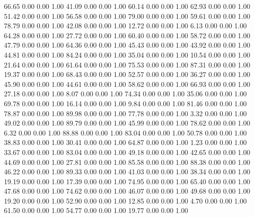    66.65   0.00   0.00   1.00
   41.09   0.00   0.00   1.00
   60.14   0.00   0.00   1.00
   62.93   0.00   0.00   1.00
   51.42   0.00   0.00   1.00
   56.58   0.00   0.00   1.00
   79.00   0.00   0.00   1.00
   59.61   0.00   0.00   1.00
   78.79   0.00   0.00   1.00
   42.08   0.00   0.00   1.00
   12.72   0.00   0.00   1.00
    6.13   0.00   0.00   1.00
   64.28   0.00   0.00   1.00
   27.72   0.00   0.00   1.00
   60.40   0.00   0.00   1.00
   58.72   0.00   0.00   1.00
   47.79   0.00   0.00   1.00
   64.36   0.00   0.00   1.00
   45.43   0.00   0.00   1.00
   43.92   0.00   0.00   1.00
   44.81   0.00   0.00   1.00
   84.24   0.00   0.00   1.00
   35.04   0.00   0.00   1.00
   10.54   0.00   0.00   1.00
   21.64   0.00   0.00   1.00
   61.64   0.00   0.00   1.00
   75.53   0.00   0.00   1.00
   87.31   0.00   0.00   1.00
   19.37   0.00   0.00   1.00
   68.43   0.00   0.00   1.00
   52.57   0.00   0.00   1.00
   36.27   0.00   0.00   1.00
   45.90   0.00   0.00   1.00
   44.61   0.00   0.00   1.00
   58.62   0.00   0.00   1.00
   66.93   0.00   0.00   1.00
   27.18   0.00   0.00   1.00
    8.07   0.00   0.00   1.00
   74.34   0.00   0.00   1.00
   35.06   0.00   0.00   1.00
   69.78   0.00   0.00   1.00
   16.14   0.00   0.00   1.00
    9.84   0.00   0.00   1.00
   81.46   0.00   0.00   1.00
   78.87   0.00   0.00   1.00
   89.98   0.00   0.00   1.00
   77.78   0.00   0.00   1.00
    3.32   0.00   0.00   1.00
   49.02   0.00   0.00   1.00
   89.79   0.00   0.00   1.00
   45.99   0.00   0.00   1.00
   78.62   0.00   0.00   1.00
    6.32   0.00   0.00   1.00
   88.88   0.00   0.00   1.00
   83.04   0.00   0.00   1.00
   50.78   0.00   0.00   1.00
   38.83   0.00   0.00   1.00
   30.41   0.00   0.00   1.00
   64.87   0.00   0.00   1.00
    1.23   0.00   0.00   1.00
   33.67   0.00   0.00   1.00
   83.04   0.00   0.00   1.00
   49.18   0.00   0.00   1.00
   42.65   0.00   0.00   1.00
   44.69   0.00   0.00   1.00
   27.81   0.00   0.00   1.00
   85.58   0.00   0.00   1.00
   88.38   0.00   0.00   1.00
   46.22   0.00   0.00   1.00
   89.33   0.00   0.00   1.00
   41.03   0.00   0.00   1.00
   38.34   0.00   0.00   1.00
   19.19   0.00   0.00   1.00
   17.39   0.00   0.00   1.00
   74.95   0.00   0.00   1.00
   65.40   0.00   0.00   1.00
   47.68   0.00   0.00   1.00
   74.62   0.00   0.00   1.00
   46.07   0.00   0.00   1.00
   49.68   0.00   0.00   1.00
   19.20   0.00   0.00   1.00
   52.90   0.00   0.00   1.00
   12.85   0.00   0.00   1.00
    4.70   0.00   0.00   1.00
   61.50   0.00   0.00   1.00
   54.77   0.00   0.00   1.00
   19.77   0.00   0.00   1.00
